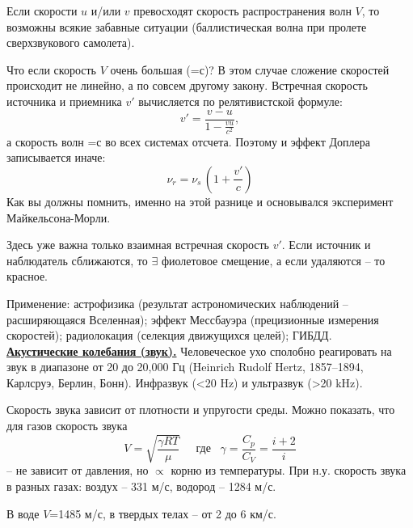 Если скорости $u$ и/или $v$ превосходят скорость распространения волн $V$, то возможны всякие забавные ситуации (баллистическая волна при пролете сверхзвукового самолета).

Что если скорость $V$ очень большая (=с)?  В этом случае сложение скоростей происходит не линейно, а по совсем другому закону. Встречная скорость источника и приемника $v'$ вычисляется по релятивистской формуле:
\begin{displaymath}
v'=\frac{v-u}{1-\frac{vu}{c^2}},
\end{displaymath}
а скорость волн =$с$ во всех системах отсчета. Поэтому и эффект Доплера записывается иначе:
\begin{displaymath}
 \nu_r=\nu_s\,\left(1+\frac {v'}c\right)
\end{displaymath}
Как вы должны помнить, именно на этой разнице и основывался эксперимент Майкельсона-Морли.

Здесь уже важна только взаимная встречная скорость $v'$. Если источник и наблюдатель сближаются, то  $\exists$ фиолетовое смещение, а если удаляются -- то красное.

Применение: астрофизика (результат астрономических наблюдений -- расширяющаяся Вселенная); эффект Мессбауэра (прецизионные из\-ме\-ре\-ния скоростей); радиолокация (селекция движущихся целей); ГИБДД.\\

\underline{\bf Акустические колебания (звук).}
Человеческое ухо сполобно ре\-а\-ги\-ро\-вать на звук в диапазоне от 20 до 20,000 Гц (Heinrich Rudolf Hertz, 1857--1894, Карлсруэ, Берлин, Бонн). Инфразвук (<20 Hz) и ультразвук (>20 kHz).

Скорость звука зависит от плотности и упругости среды. Можно по\-ка\-зать, что для газов скорость звука
\begin{displaymath}
V=\sqrt{\frac{\gamma RT}{\mu}}\;\;\;\;\;\texttt{где}\;\;\;\gamma=\frac{C_p}{C_V}=\frac{i+2}i
\end{displaymath}
-- не зависит от давления, но $\propto$ корню из температуры. При н.у. скорость звука в разных газах: воздух -- 331 м/с, водород -- 1284 м/с.

В воде $V$=1485 м/с, в твердых телах -- от 2 до 6 км/с.
